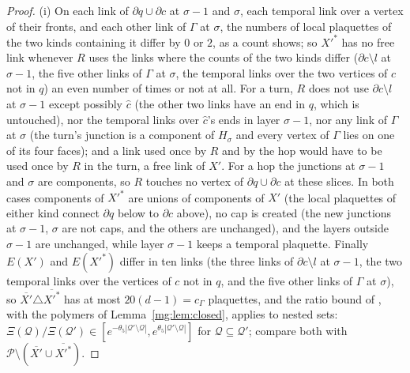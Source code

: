 \documentclass[11pt,a4paper]{article}
\theoremstyle{definition}
\theoremstyle{remark}
\newcommand{\cP}{\mathcal{P}}
\newcommand{\IIIlab}[2]{\cite[#1 \texttt{#2}]{III}}
\begin{document}
\begin{proof}
(i) On each link of $\partial q\cup\partial c$ at $\sigma-1$ and $\sigma$, each temporal link over a vertex of their fronts, and each other link of $\Gamma$ at $\sigma$,
the numbers of local plaquettes of the two kinds containing it differ by $0$ or $2$, as a count shows; so $X'^*$ has no free link whenever $R$ uses the links where
the counts of the two kinds differ ($\partial c\setminus l$ at $\sigma-1$, the five other links of $\Gamma$ at $\sigma$, the temporal links over the two vertices of
$c$ not in $q$) an even number of times or not at all. For a turn, $R$ does not use $\partial c\setminus l$ at $\sigma-1$ except possibly $\hat c$ (the other two
links have an end in $q$, which is untouched), nor the temporal links over $\hat c$'s ends in layer $\sigma-1$, nor any link of $\Gamma$ at $\sigma$ (the turn's
junction is a component of $H_\sigma$ and every vertex of $\Gamma$ lies on one of its four faces); and a link used once by $R$ and by the hop would have to be
used once by $R$ in the turn, a free link of $X'$. For a hop the junctions at $\sigma-1$ and $\sigma$ are components, so $R$ touches no vertex of $\partial q\cup\partial c$ at
these slices. In both cases components of $X'^*$ are unions of components of $X'$ (the local plaquettes of either kind connect $\partial q$ below to $\partial c$
above), no cap is created (the new junctions at $\sigma-1$, $\sigma$ are not caps, and the others are unchanged), and the layers outside $\sigma-1$ are unchanged,
while layer $\sigma-1$ keeps a temporal plaquette. Finally $E(X')$ and $E(X'^*)$ differ in ten links (the three links of $\partial c\setminus l$ at $\sigma-1$, the two temporal links over the
vertices of $c$ not in $q$, and the five other links of $\Gamma$ at $\sigma$), so $\overline{X'}\triangle\overline{X'^*}$ has at most $20(d-1)=c_\Gamma$ plaquettes, and the ratio bound of \IIIlab{Lemma}{al:lem:ratio}, with the polymers of Lemma~\ref{mg:lem:closed},
applies to nested sets: $\Xi(\mathcal Q)/\Xi(\mathcal Q')\in[e^{-\theta_5|\mathcal Q'\setminus\mathcal Q|},e^{\theta_5|\mathcal Q'\setminus\mathcal Q|}]$ for $\mathcal Q\subseteq\mathcal Q'$; compare
both with $\cP\setminus(\overline{X'}\cup\overline{X'^*})$.


\end{proof}
\end{document}
